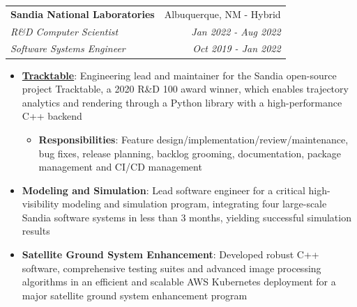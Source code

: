 \documentclass[letterpaper,10pt]{article}
\makeatletter
\newcommand{\resumeItem}[2]{
  \item\small{
    \textbf{#1}{: #2 \vspace{-1.5pt}}
  }
}
\newcommand{\resumeSubheadingPromo}[6]{
  \vspace{-1pt}\item
    \begin{tabular*}{0.97\textwidth}{l@{\extracolsep{\fill}}r}
      \textbf{#1} & #2 \\
      \textit{\small#3} & \textit{\small #4} \\
      \textit{\small#5} & \textit{\small #6} \\
    \end{tabular*}\vspace{-5pt}
}
\newcommand{\resumeItemListStart}{\begin{itemize}}
\newcommand{\resumeItemListEnd}{\end{itemize}\vspace{-1pt}}
\makeatother
\begin{document}
  \resumeSubheadingPromo
    {Sandia National Laboratories}{Albuquerque, NM - Hybrid}
    {R\&D Computer Scientist}{Jan 2022 - Aug 2022}
    {Software Systems Engineer}{Oct 2019 - Jan 2022}
    \resumeItemListStart
      \resumeItem{\href{https://tracktable.sandia.gov/}{Tracktable}}
        {Engineering lead and maintainer for the Sandia open-source project Tracktable, a 2020 R\&D 100 award winner, which enables trajectory analytics and rendering through a Python library with a high-performance C++ backend}
        \resumeItemListStart
          \resumeItem{Responsibilities}{Feature design/implementation/review/maintenance, bug fixes, release planning, backlog grooming, documentation, package management and CI/CD management}
        \resumeItemListEnd
      \resumeItem{Modeling and Simulation}
        {Lead software engineer for a critical high-visibility modeling and simulation program, integrating four large-scale Sandia software systems in less than 3 months, yielding successful simulation results}
      \resumeItem{Satellite Ground System Enhancement}
        {Developed robust C++ software, comprehensive testing suites and advanced image processing algorithms in an efficient and scalable AWS Kubernetes deployment for a major satellite ground system enhancement program}
    \resumeItemListEnd
\end{document}
